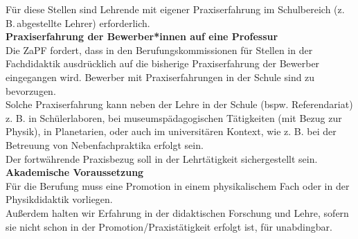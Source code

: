 Für diese Stellen sind Lehrende mit eigener Praxiserfahrung im Schulbereich (z.\,B.\,abgestellte Lehrer) erforderlich.
\vspace{0.5\baselineskip}\\
\textbf{Praxiserfahrung der Bewerber*innen auf eine Professur}\\
Die ZaPF fordert, dass in den Berufungskommissionen für Stellen in der Fachdidaktik ausdrücklich auf die bisherige Praxiserfahrung der Bewerber eingegangen wird. Bewerber mit Praxiserfahrungen in der Schule sind zu bevorzugen.\\
Solche Praxiserfahrung kann neben der Lehre in der Schule (bspw. Referendariat) z. B. in Schülerlaboren, bei museumspädagogischen Tätigkeiten (mit Bezug zur Physik), in Planetarien, oder auch im universitären Kontext, wie z. B. bei der Betreuung von Nebenfachpraktika erfolgt sein.\\
Der fortwährende Praxisbezug soll in der Lehrtätigkeit sichergestellt sein.
\vspace{0.5\baselineskip}\\
\textbf{Akademische Voraussetzung}\\
Für die Berufung muss eine Promotion in einem physikalischem Fach oder in der Physikdidaktik vorliegen.\\
Außerdem halten wir Erfahrung in der didaktischen Forschung und Lehre, sofern sie nicht schon in der Promotion/Praxistätigkeit erfolgt ist, für unabdingbar.
